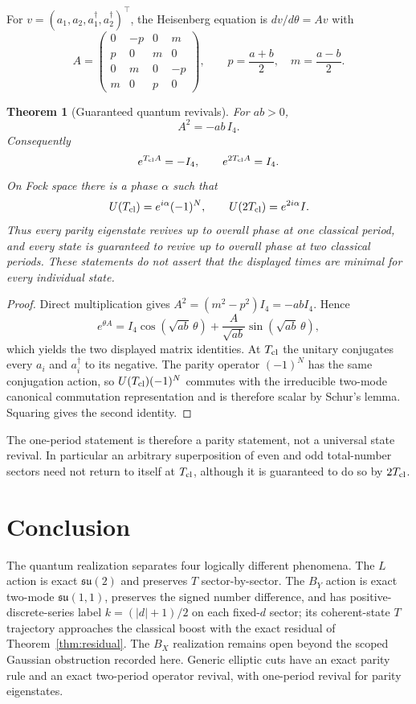 \documentclass[11pt]{amsart}
\newtheorem{theorem}{Theorem}[section]
\theoremstyle{remark}
\begin{document}
For $v=(a_1,a_2,a_1^\dagger,a_2^\dagger)^\top$, the Heisenberg equation is $dv/d\theta=Av$ with
\[
A=\begin{pmatrix}
0&-p&0&m\\
p&0&m&0\\
0&m&0&-p\\
m&0&p&0
\end{pmatrix},\qquad p=\frac{a+b}{2},\quad m=\frac{a-b}{2}.
\]

\begin{theorem}[Guaranteed quantum revivals]\label{thm:revival}
For $ab>0$,
\[
\boxed{A^2=-ab\,I_4.}
\]
Consequently
\[
e^{T_{\rm cl}A}=-I_4,\qquad e^{2T_{\rm cl}A}=I_4.
\]
On Fock space there is a phase $\alpha$ such that
\[
U(T_{\rm cl})=e^{i\alpha}(-1)^N,
\qquad
U(2T_{\rm cl})=e^{2i\alpha}I.
\]
Thus every parity eigenstate revives up to overall phase at one classical period, and every state is guaranteed to revive up to overall phase at two classical periods.  These statements do not assert that the displayed times are minimal for every individual state.
\end{theorem}
\begin{proof}
Direct multiplication gives $A^2=(m^2-p^2)I_4=-abI_4$.  Hence
\[
e^{\theta A}=I_4\cos(\sqrt{ab}\,\theta)+\frac{A}{\sqrt{ab}}\sin(\sqrt{ab}\,\theta),
\]
which yields the two displayed matrix identities.  At $T_{\rm cl}$ the unitary conjugates every $a_i$ and $a_i^\dagger$ to its negative.  The parity operator $(-1)^N$ has the same conjugation action, so $U(T_{\rm cl})(-1)^N$ commutes with the irreducible two-mode canonical commutation representation and is therefore scalar by Schur's lemma.  Squaring gives the second identity.
\end{proof}

The one-period statement is therefore a parity statement, not a universal state revival.  In particular an arbitrary superposition of even and odd total-number sectors need not return to itself at $T_{\rm cl}$, although it is guaranteed to do so by $2T_{\rm cl}$.

\section{Conclusion}
The quantum realization separates four logically different phenomena.  The $L$ action is exact $\mathfrak{su}(2)$ and preserves $T$ sector-by-sector.  The $B_Y$ action is exact two-mode $\mathfrak{su}(1,1)$, preserves the signed number difference, and has positive-discrete-series label $k=(|d|+1)/2$ on each fixed-$d$ sector; its coherent-state $T$ trajectory approaches the classical boost with the exact residual of Theorem~\ref{thm:residual}.  The $B_X$ realization remains open beyond the scoped Gaussian obstruction recorded here.  Generic elliptic cuts have an exact parity rule and an exact two-period operator revival, with one-period revival for parity eigenstates.
\end{document}
